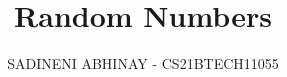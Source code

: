 \documentclass[journal,12pt,twocolumn]{IEEEtran}
\renewcommand\thesection{\arabic{section}}
\begin{document}
\let\StandardTheFigure\thefigure
\renewcommand{\thefigure}{\thesection}



\makeatletter
{}
\makeatother

\let\StandardTheFigure\thefigure
\let\StandardTheTable\thetable
\let\vec\mathbf
{}

\vspace{3cm}


\title{%
	{
	Random Numbers
	}
}


%
%
%

\author{ SADINENI ABHINAY - CS21BTECH11055}

% 
%
\end{document}

